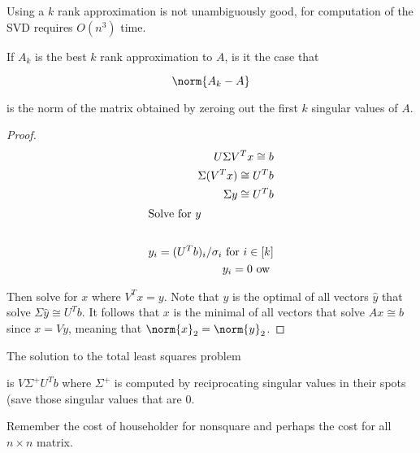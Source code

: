 \documentclass[../main.tex]{subfiles}
\begin{document}
\begin{remark}
    Using a $k$ rank approximation is not unambiguously good, for computation of the SVD requires $O(n^3)$ time.
\end{remark}

\begin{unresolved}
    If $A_k$ is the best $k$ rank approximation to $A$, is it the case that

    \[
        \norm{A_k - A}
    \]

    is the norm of the matrix obtained by zeroing out the first $k$ singular values of $A$.
\end{unresolved}

\begin{theorem}
    
\end{theorem}
\begin{proof}
    \begin{align*}
        U \Sigma V^T x \cong b \\
        \Sigma (V^Tx) \cong U^T b\\
        \Sigma y \cong U^T b \\
        \intertext{Solve for $y$} \\
        y_i = (U^Tb)_i/\sigma_i \text{ for } i\in [k]\\
        y_i = 0 \text{ ow }\\
    \end{align*}

    Then solve for $x$ where $V^Tx = y$. Note that $y$ is the optimal of all vectors $\hat{y}$ that solve $\Sigma \hat{y} \cong U^Tb$. It follows that $x$ is the minimal of all vectors that solve $Ax \cong b$ since $x = Vy$, meaning that $\norm{x}_2 = \norm{y}_2$.
\end{proof}

\begin{definition}
    The solution to the total least squares problem

    is $V \Sigma^{+} U^T b$ where $\Sigma^{+}$ is computed by reciprocating singular values in their spots (save those singular values that are $0$.
\end{definition}

\begin{remark}
    Remember the cost of householder for nonsquare
    and perhaps the cost for all $n \times n$ matrix.
\end{remark}
\end{document}
